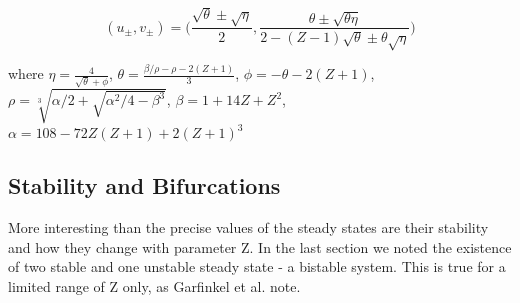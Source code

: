 \documentclass{article}
\begin{document}
$$(u_\pm,v_\pm)=\Bigg(\frac{\sqrt{\theta}\pm\sqrt{\eta}}{2}, \frac{\theta\pm\sqrt{\theta\eta}}{2-(Z-1)\sqrt{\theta}\pm\theta\sqrt{\eta}}\Bigg)$$

where $\eta = \frac{4}{\sqrt{\theta}+\phi}$, $\theta=\frac{\beta/\rho-\rho-2(Z+1)}{3}$, $\phi = -\theta-2(Z+1)$, $\rho = \sqrt[3]{\alpha/2+\sqrt{\alpha^2/4-\beta^3}}$, $\beta = 1+14Z+Z^2$, $\alpha = 108-72Z(Z+1)+2(Z+1)^3$

\subsection{Stability and Bifurcations}

More interesting than the precise values of the steady states are their stability and how they change with parameter Z. In the last section we noted the existence of two stable and one unstable steady state - a bistable system. This is true for a limited range of Z only, as Garfinkel et al. note.
\end{document}
